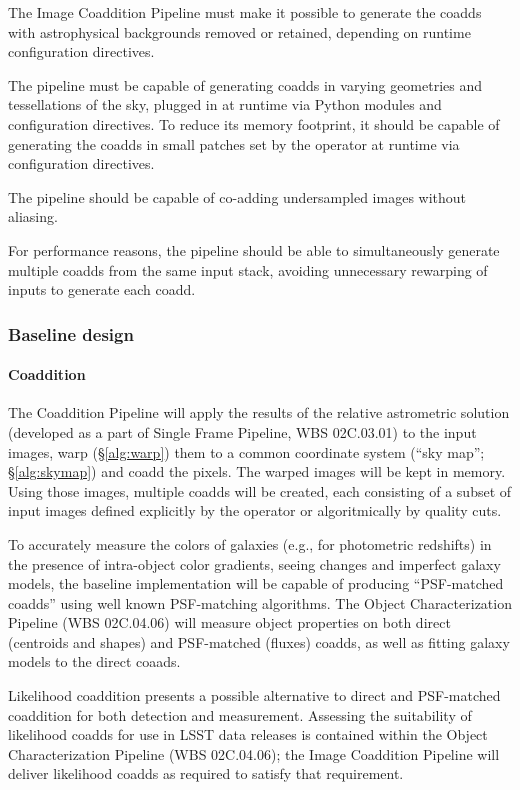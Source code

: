 \documentclass[12pt]{article}
\newcommand{\wbsSFM}{WBS 02C.03.01}
\newcommand{\wbsObjChar}{WBS 02C.04.06}
\begin{document}
The Image Coaddition Pipeline must make it possible to generate the coadds with astrophysical backgrounds removed or retained, depending on runtime configuration directives.

The pipeline must be capable of generating coadds in varying geometries and tessellations of the sky, plugged in at runtime via Python modules and configuration directives. To reduce its memory footprint, it should be capable of generating the coadds in small patches set by the operator at runtime via configuration directives.

The pipeline should be capable of co-adding undersampled images without aliasing.

For performance reasons, the pipeline should be able to simultaneously generate multiple coadds from the same input stack, avoiding unnecessary rewarping of inputs to generate each coadd.

\subsubsection{Baseline design}

\paragraph{Coaddition}
\label{alg:coadd}

The Coaddition Pipeline will apply the results of the relative astrometric solution (developed as a part of Single Frame Pipeline, \wbsSFM) to the input images, warp (\S\ref{alg:warp}) them to a common coordinate system (``sky map''; \S\ref{alg:skymap}) and coadd the pixels. The warped images will be kept in memory. Using those images, multiple coadds will be created, each consisting of a subset of input images defined explicitly by the operator or algoritmically by quality cuts.

To accurately measure the colors of galaxies (e.g., for photometric redshifts) in the presence of intra-object color gradients, seeing changes and imperfect galaxy models, the baseline implementation will be capable of producing ``PSF-matched coadds'' using well known PSF-matching algorithms. The Object Characterization Pipeline (\wbsObjChar) will measure object properties on both direct (centroids and shapes) and PSF-matched (fluxes) coadds, as well as fitting galaxy models to the direct coaads.

Likelihood coaddition presents a possible alternative to direct and PSF-matched coaddition for both detection and measurement. Assessing the suitability of likelihood coadds for use in LSST data releases is contained within the Object Characterization Pipeline (\wbsObjChar); the Image Coaddition Pipeline will deliver likelihood coadds as required to satisfy that requirement.
\end{document}
